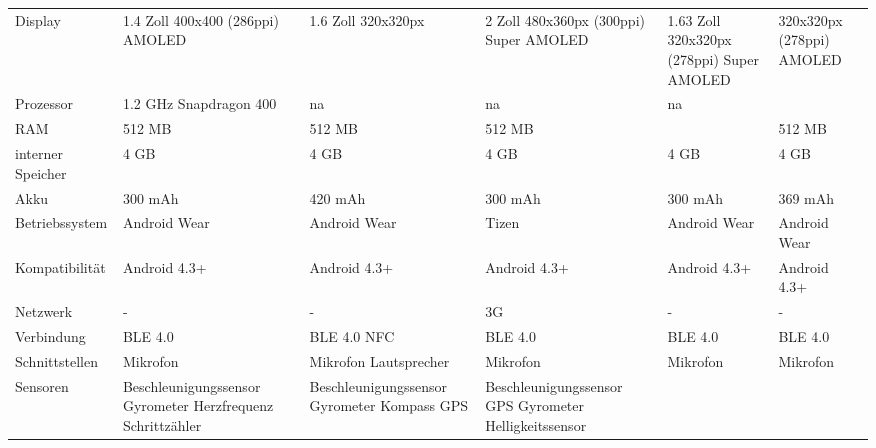 \begin{landscape}
\begin{longtable}{p{2.8cm}p{3.5cm}p{3.5cm}p{3.5cm}p{3.5cm}p{3.5cm}}
	Display
		& 1.4 Zoll \newline
			400x400 (286ppi) \newline
			AMOLED
		& 1.6 Zoll \newline
			320x320px
		& 2 Zoll \newline
			480x360px (300ppi) \newline
			Super AMOLED
		& 1.63 Zoll \newline
			320x320px (278ppi) \newline
			Super AMOLED
		& \newline
			320x320px (278ppi) \newline
			AMOLED \\
	Prozessor
		& 1.2 GHz \newline
			Snapdragon 400
		& na
		& na
		& na
		& \\
	RAM
		& 512 MB
		& 512 MB
		& 512 MB
		&
		& 512 MB\\
	interner Speicher
		& 4 GB
		& 4 GB
		& 4 GB
		& 4 GB
		& 4 GB\\
	Akku
		& 300 mAh
		& 420 mAh 
		& 300 mAh
		& 300 mAh
		& 369 mAh\\
	Betriebssystem
		& Android Wear
		& Android Wear
		& Tizen 
		& Android Wear
		& Android Wear \\
	Kompatibilität
		& Android 4.3+
		& Android 4.3+
		& Android 4.3+
		& Android 4.3+
		& Android 4.3+ \\
	Netzwerk
		& -
		& -
		& 3G
		& -
		& -\\
	Verbindung
		& BLE 4.0
		& BLE 4.0 \newline
			NFC
		& BLE 4.0
		& BLE 4.0
		& BLE 4.0\\
	Schnittstellen
		& Mikrofon
		& Mikrofon \newline
			Lautsprecher
		& Mikrofon
		& Mikrofon
		& Mikrofon \\
	Sensoren
		& Beschleunigungssensor \newline
			Gyrometer \newline
			Herzfrequenz \newline
			Schrittzähler
		& Beschleunigungssensor \newline
			Gyrometer \newline
			Kompass \newline
			GPS
		& Beschleunigungssensor \newline
			GPS \newline
			Gyrometer \newline
			Helligkeitssensor\newline			

\end{longtable}
\end{landscape}
